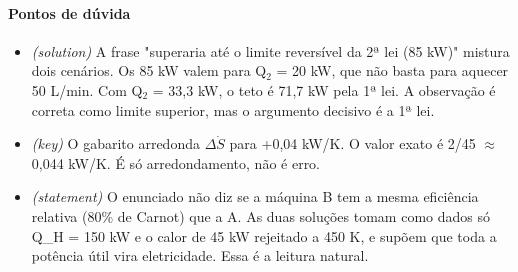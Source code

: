 \documentclass{article}%
\begin{document}
\paragraph{Pontos de dúvida}%
\begin{itemize}%
\item%
\textit{(solution)} A frase "superaria até o limite reversível da 2ª lei (85 kW)" mistura dois cenários. Os 85 kW valem para Q$_{2}$ = 20 kW, que não basta para aquecer 50 L/min. Com Q$_{2}$ = 33,3 kW, o teto é 71,7 kW pela 1ª lei. A observação é correta como limite superior, mas o argumento decisivo é a 1ª lei.%
\item%
\textit{(key)} O gabarito arredonda $\Delta$$\dot S$ para +0,04 kW/K. O valor exato é 2/45 $\approx$ 0,044 kW/K. É só arredondamento, não é erro.%
\item%
\textit{(statement)} O enunciado não diz se a máquina B tem a mesma eficiência relativa (80\% de Carnot) que a A. As duas soluções tomam como dados só Q\_H = 150 kW e o calor de 45 kW rejeitado a 450 K, e supõem que toda a potência útil vira eletricidade. Essa é a leitura natural.%
\end{itemize}%
\end{document}
